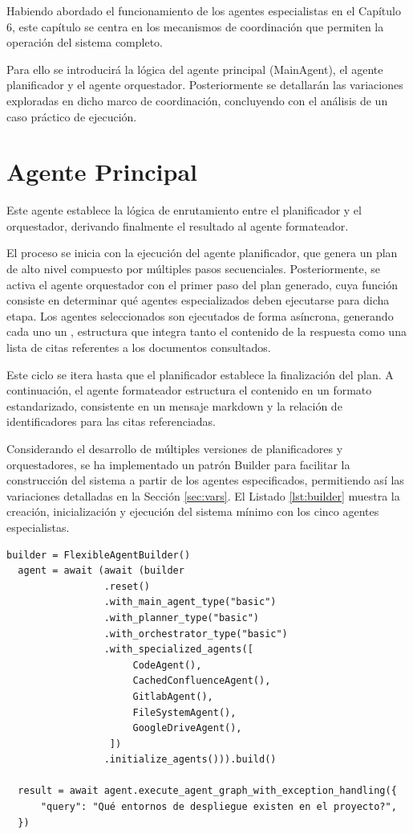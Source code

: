 Habiendo abordado el funcionamiento de los agentes especialistas en el Capítulo 6, este capítulo se centra en los mecanismos de coordinación que permiten la operación del sistema completo.

Para ello se introducirá la lógica del agente principal (MainAgent), el agente planificador y el agente orquestador. Posteriormente se detallarán las variaciones exploradas en dicho marco de coordinación, concluyendo con el análisis de un caso práctico de ejecución.

\section{Agente Principal}
\label{sec:principal}
Este agente establece la lógica de enrutamiento entre el planificador y el orquestador, derivando finalmente el resultado al agente formateador.

El proceso se inicia con la ejecución del agente planificador, que genera un plan de alto nivel compuesto por múltiples pasos secuenciales. Posteriormente, se activa el agente orquestador con el primer paso del plan generado, cuya función consiste en determinar qué agentes especializados deben ejecutarse para dicha etapa. Los agentes seleccionados son ejecutados de forma asíncrona, generando cada uno un , estructura que integra tanto el contenido de la respuesta como una lista de citas referentes a los documentos consultados.

Este ciclo se itera hasta que el planificador establece la finalización del plan. A continuación, el agente formateador estructura el contenido en un formato estandarizado, consistente en un mensaje markdown y la relación de identificadores para las citas referenciadas.

Considerando el desarrollo de múltiples versiones de planificadores y orquestadores, se ha implementado un patrón Builder para facilitar la construcción del sistema a partir de los agentes especificados, permitiendo así las variaciones detalladas en la Sección \ref{sec:vars}. El Listado \ref{lst:builder} muestra la creación, inicialización y ejecución del sistema mínimo con los cinco agentes especialistas.

\begin{lstlisting}[caption={Instanciación y ejecución del sistema mínimo con el patrón Builder},label={lst:builder}]
  builder = FlexibleAgentBuilder()
  agent = await (await (builder
                 .reset()
                 .with_main_agent_type("basic")
                 .with_planner_type("basic")
                 .with_orchestrator_type("basic")
                 .with_specialized_agents([
                      CodeAgent(),
                      CachedConfluenceAgent(),
                      GitlabAgent(),
                      FileSystemAgent(),
                      GoogleDriveAgent(),
                  ])
                 .initialize_agents())).build()

  result = await agent.execute_agent_graph_with_exception_handling({
      "query": "Qué entornos de despliegue existen en el proyecto?",
  })
\end{lstlisting}

